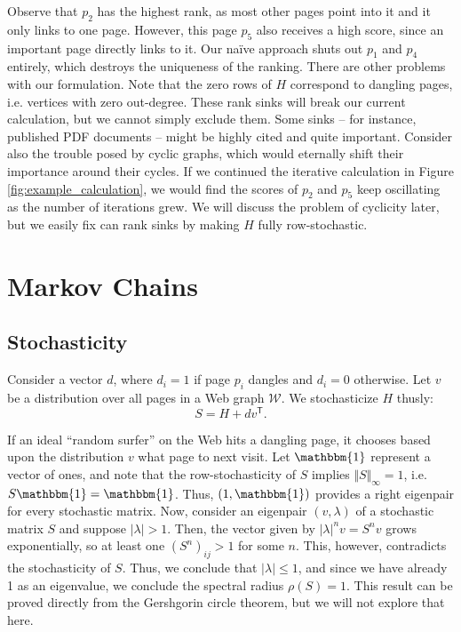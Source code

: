 \documentclass[11pt,letterpaper]{amsart}
\newcommand{\transpose}[1]{#1^{\mathsf{T}}}
\begin{document}
Observe that $p_2$ has the highest rank, as most other pages point into it
and it only links to one page. However, this page $p_5$ also receives a high
score, since an important page directly links to it. Our na{\"i}ve approach
shuts out $p_1$ and $p_4$ entirely, which destroys the uniqueness of the
ranking. There are other problems with our formulation. Note that the zero
rows of $H$ correspond to dangling pages, i.e. vertices with zero
out-degree. These rank sinks will break our current calculation, but we
cannot simply exclude them. Some sinks -- for instance, published PDF
documents -- might be highly cited and quite important. Consider also the
trouble posed by cyclic graphs, which would eternally shift their importance
around their cycles. If we continued the iterative calculation in Figure
\ref{fig:example_calculation}, we would find the scores of $p_2$ and $p_5$
keep oscillating as the number of iterations grew. We will discuss the
problem of cyclicity later, but we easily fix can rank sinks by making $H$
fully row-stochastic.



\section{Markov Chains}


\subsection{Stochasticity}
Consider a vector $d$, where $d_i=1$ if page $p_i$ dangles and $d_i=0$
otherwise. Let $v$ be a distribution over all pages in a Web graph
$\mathcal{W}$. We stochasticize $H$ thusly:
\begin{equation}
  \label{eqn:S}
  S=H + d\transpose{v}.
\end{equation}

If an ideal ``random surfer'' on the Web hits a dangling page, it chooses based
upon the distribution $v$ what page to next visit. Let $\mathbbm{1}$ represent a
vector of ones, and note that the row-stochasticity of $S$ implies
$\Vert S \Vert_{\infty} = 1$, i.e. $S \mathbbm{1} = \mathbbm{1}$. Thus,
$(1, \mathbbm{1})$ provides a right eigenpair for every stochastic matrix. Now,
consider an eigenpair $(v, \lambda)$ of a stochastic matrix $S$ and suppose
$|\lambda| > 1$. Then, the vector given by $|\lambda|^n v = S^n v$ grows
exponentially, so at least one $(S^n)_{ij} > 1$ for some $n$. This, however,
contradicts the stochasticity of $S$. Thus, we conclude that $|\lambda| \leq 1$,
and since we have already 1 as an eigenvalue, we conclude the spectral radius
$\rho(S)=1$. This result can be proved directly from the Gershgorin circle
theorem, but we will not explore that here.
\end{document}
